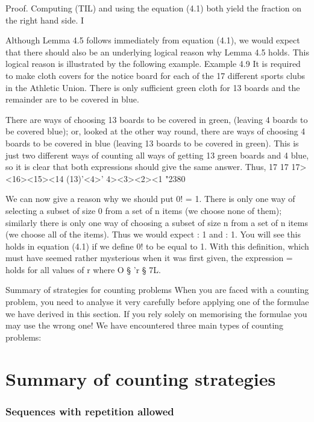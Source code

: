 \documentclass{beamer}
\begin{document}
\begin{frame}
\begin{frame}
Proof. Computing (TIL) and  using the equation (4.1) both yield
the fraction on the right hand side. I

\end{frame}
\begin{frame}
Although Lemma 4.5 follows immediately from equation (4.1), we
would expect that there should also be an underlying logical reason
why Lemma 4.5 holds. This logical reason is illustrated by the
following example.
Example 4.9 It is required to make cloth covers for the notice board
for each of the 17 different sports clubs in the Athletic Union. There
is only sufficient green cloth for 13 boards and the remainder are to
be covered in blue.
\end{frame}
\begin{frame}
There are  ways of choosing 13 boards to be covered in green,
(leaving 4 boards to be covered blue); or, looked at the other way
round, there are  ways of choosing 4 boards to be covered in blue
(leaving 13 boards to be covered in green). This is just two different
ways of counting all ways of getting 13 green boards and 4 blue, so
it is clear that both expressions should give the same answer. Thus,
17 17 17><16><15><14
(13)'<4>' 4><3><2><1 "2380
\end{frame}
\begin{frame}
We can now give a reason why we should put 0! = 1. There is only
one way of selecting a subset of size 0 from a set of n items (we
choose none of them); similarly there is only one way of choosing a
subset of size n from a set of n items (we choose all of the items).
Thus we would expect  : 1 and  : 1. You will see this holds in
equation (4.1) if we deﬁne 0! to be equal to 1. With this deﬁnition,
which must have seemed rather mysterious when it was ﬁrst given,
the expression  =  holds for all values of r where
O § 'r § 7L.
\end{frame}
\begin{frame}
Summary of strategies for counting problems
When you are faced with a counting problem, you need to analyse it
very carefully before applying one of the formulae we have derived
in this section. If you rely solely on memorising the formulae you
may use the wrong one! We have encountered three main types of
counting problems:

\end{frame}
\section{Summary of counting strategies}
\begin{frame}
\frametitle{Sequences with repetition allowed}


\end{frame}
\end{frame}
\end{document}
